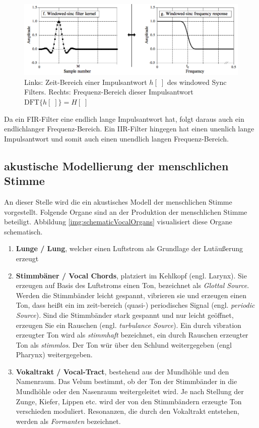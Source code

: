 \begin{figure}[h]
	\centering
	\includegraphics[width=1\textwidth]{bilder/lowPassFilter.png}
	\caption{Links: Zeit-Bereich einer Impulsantwort $h[\;]$ des \glqq windowed Sync Filters\grqq. Rechts: Frequenz-Bereich dieser Impulsantwort $\text{DFT}\{h[\;]\} = H[\;]$ \cite[S. 287]{dspGuide}}
	\label{img:kernelFreq}
\end{figure}

Da ein FIR-Filter eine endlich lange Impulsantwort hat, folgt daraus auch ein endlichlanger Frequenz-Bereich. Ein IIR-Filter hingegen hat einen unenlich lange Impulsantwort und somit auch einen unendlich langen Frequenz-Bereich.

\subsection{akustische Modellierung der menschlichen Stimme}
\label{sec:theVoice}

An dieser Stelle wird die ein akustisches Modell der menschlichen Stimme vorgestellt. Folgende Organe sind an der Produktion der menschlichen Stimme beteiligt. Abbildung \ref{img:schematicVocalOrgans} visualisiert diese Organe schematisch.

\begin{enumerate}
	\item \textbf{Lunge / Lung}, welcher einen Luftstrom als Grundlage der Lutäußerung erzeugt
	\item \textbf{Stimmbäner / Vocal Chords}, platziert im Kehlkopf (engl. Larynx). Sie erzeugen auf Basis des Luftstroms einen Ton, bezeichnet als \emph{Glottal Source}. Werden die Stimmbänder leicht gespannt, vibrieren sie und erzeugen einen Ton, dass heißt ein im zeit-bereich (quasi-) periodisches Signal (engl. \emph{periodic Source}). Sind die Stimmbänder stark gespannt und nur leicht geöffnet, erzeugen Sie ein Rauschen (engl. \emph{turbulance Source}). Ein durch vibration erzeugter Ton wird als \emph{stimmhaft} bezeichnet, ein durch Rauschen erzeugter Ton als \emph{stimmlos}. Der Ton wür über den Schlund weitergegeben (engl Pharynx) weitergegeben. 
	\item  \textbf{Vokaltrakt / Vocal-Tract}, bestehend aus der Mundhöhle und den Namenraum. Das Velum bestimmt, ob der Ton der Stimmbänder in die Mundhöhle oder den Nasenraum weitergeleitet wird. Je nach Stellung der Zunge, Kiefer, Lippen etc. wird der von den Stimmbändern erzeugte Ton verschieden moduliert. Resonanzen, die durch den Vokaltrakt entstehen, werden als \emph{Formanten} bezeichnet. \cite[S. 62]{cryModel} \cite{speechProduction}
\end{enumerate}
	
